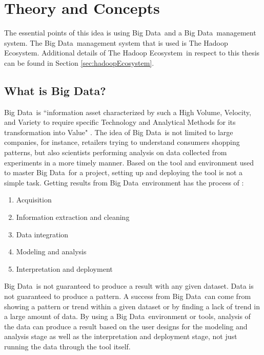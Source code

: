 \documentclass[titlepage,twocolumn]{article}
\newcommand{\HadoopEcosystem}{Hadoop Ecosystem}
\newcommand{\BigData}{Big Data}
\begin{document}
\section{Theory and Concepts}

\par The essential points of this idea is using \BigData\ and a \BigData\ management system. The \BigData\ management system that is used is The \HadoopEcosystem. Additional details of The \HadoopEcosystem\ in respect to this thesis can be found in Section \ref{sec:hadoopEcosystem}.


\subsection{What is \BigData?}

\par \BigData\ is ``information asset characterized by such a High Volume, Velocity, and Variety to require specific Technology and Analytical Methods for its transformation into Value" \cite{doi:10.1108/LR-06-2015-0061}. The idea of \BigData\ is not limited to large companies, for instance, retailers trying to understand consumers shopping patterns, but also scientists performing analysis on data collected from experiments in a more timely manner. Based on the tool and environment used to master \BigData\ for a project, setting up and deploying the tool is not a simple task. Getting results from \BigData\ environment has the process of \cite{BigDataAndItsTechnicalChallenges}: 
\begin{enumerate}
	\item Acquisition
	\item Information extraction and cleaning
	\item Data integration
	\item Modeling and analysis
	\item Interpretation and deployment
\end{enumerate}

\par \BigData\ is not guaranteed to produce a result with any given dataset. Data is not guaranteed to produce a pattern. A success from \BigData\ can come from showing a pattern or trend within a given dataset or by finding a lack of trend in a large amount of data. By using a \BigData\ environment or tools, analysis of the data can produce a result based on the user designs for the modeling and analysis stage as well as the interpretation and deployment stage, not just running the data through the tool itself. 
\end{document}
